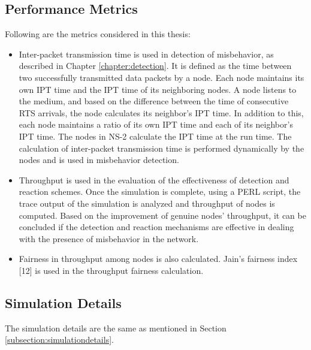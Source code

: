 \documentclass[12pt,letterpaper,english]{article}
\begin{document}
\subsection{Performance Metrics}
\indent Following are the metrics considered in this thesis:
\begin{itemize}
\item Inter-packet transmission time is used in detection of misbehavior, as described in Chapter \ref{chapter:detection}. 
It is defined as the time between two successfully transmitted data packets by a node. 
Each node maintains its own IPT time and the IPT time of its neighboring nodes.
A node listens to the medium, and based on the difference between the time of consecutive RTS arrivals, the node calculates its neighbor's IPT time. 
In addition to this, each node maintains a ratio of its own IPT time and each of its neighbor's IPT time. 
The nodes in NS-2 calculate the IPT time at the run time. 
The calculation of inter-packet transmission time is performed dynamically by the nodes and is used in misbehavior detection. 
\item Throughput is used in the evaluation of the effectiveness of detection and reaction schemes. 
Once the simulation is complete, using a PERL script, the trace output of the simulation is analyzed and throughput of nodes is computed. 
Based on the improvement of genuine nodes' throughput, it can be concluded if the detection and reaction mechanisms are effective in dealing with the presence of misbehavior in the network.
\item Fairness in throughput among nodes is also calculated. Jain's fairness index 
[12] 
is used in the throughput fairness calculation.
\end{itemize}
\subsection{Simulation Details}
\indent The simulation details are the same as mentioned in Section \ref{subsection:simulationdetails}.
\end{document}
